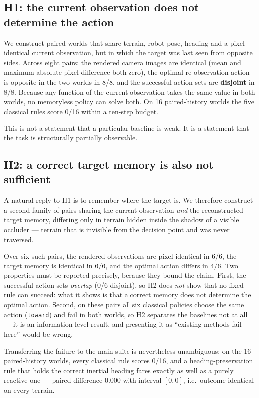 \documentclass[utf8]{FrontiersinHarvard}
\begin{document}
\subsection{H1: the current observation does not determine the action}

We construct paired worlds that share terrain, robot pose, heading and a
pixel-identical current observation, but in which the target was last seen from opposite
sides. Across eight pairs: the rendered camera images are identical (mean and maximum
absolute pixel difference both zero), the optimal re-observation action is opposite in
the two worlds in 8/8, and the successful action sets are \textbf{disjoint} in 8/8.
Because any function of the current observation takes the same value in both worlds, no
memoryless policy can solve both. On 16 paired-history worlds the five classical rules
score 0/16 within a ten-step budget.

This is not a statement that a particular baseline is weak. It is a statement that the
task is structurally partially observable.

\subsection{H2: a correct target memory is also not sufficient}

A natural reply to H1 is to remember where the target is. We therefore construct a
second family of pairs sharing the current observation \emph{and} the reconstructed
target memory, differing only in terrain hidden inside the shadow of a visible occluder
--- terrain that is invisible from the decision point and was never traversed.

Over six such pairs, the rendered observations are pixel-identical in 6/6, the target
memory is identical in 6/6, and the optimal action differs in 4/6. Two properties must
be reported precisely, because they bound the claim. First, the successful action sets
\emph{overlap} (0/6 disjoint), so H2 does \emph{not} show that no fixed rule can
succeed: what it shows is that a correct memory does not determine the optimal action.
Second, on these pairs all six classical policies choose the same action (\texttt{toward})
and fail in both worlds, so H2 separates the baselines not at all --- it is an
information-level result, and presenting it as ``existing methods fail here'' would be
wrong.

Transferring the failure to the main suite is nevertheless unambiguous: on the 16
paired-history worlds, every classical rule scores 0/16, and a heading-preservation rule
that holds the correct inertial heading fares exactly as well as a purely reactive one
--- paired difference 0.000 with interval $[0,0]$, i.e.\ outcome-identical on every
terrain.
\end{document}
